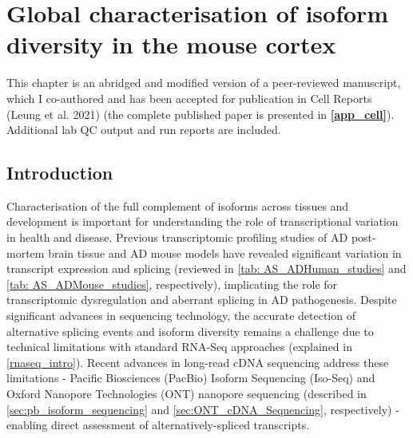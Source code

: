 \cleardoublepage
\chapter{Global characterisation of isoform diversity in the mouse cortex}
\label{ch: whole_transcriptome}


This chapter is an abridged and modified version of a peer-reviewed manuscript, which I co-authored and has been accepted for publication in Cell Reports (Leung et al. 2021)\cite{Leung2021} (the complete published paper is presented in \textbf{\cref{app_cell}}). Additional lab QC output and run reports are included. 

\section{Introduction}
Characterisation of the full complement of isoforms across tissues and development is important for understanding the role of transcriptional variation in health and disease. Previous transcriptomic profiling studies of AD post-mortem brain tissue and AD mouse models have revealed significant variation in transcript expression and splicing (reviewed in \cref{tab: AS_ADHuman_studies} and \cref{tab: AS_ADMouse_studies}, respectively), implicating the role for transcriptomic dysregulation and aberrant splicing in AD pathogenesis\cite{Raj2018}. Despite significant advances in sequencing technology, the accurate detection of alternative splicing events and isoform diversity remains a challenge due to technical limitations with standard RNA-Seq approaches (explained in \cref{rnaseq_intro}). Recent advances in long-read cDNA sequencing address these limitations - Pacific Biosciences (PacBio) Isoform Sequencing (Iso-Seq) and Oxford Nanopore Technologies (ONT) nanopore sequencing (described in \cref{sec:pb_isoform_sequencing} and \cref{sec:ONT_cDNA_Sequencing}, respectively) - enabling direct assessment of alternatively-spliced transcripts\cite{Amarasinghe2020}.


